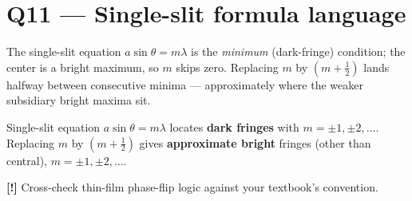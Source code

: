 \documentclass[11pt]{article}
\newcommand{\warn}{\textbf{[!]}}
\begin{document}
\section*{Q11 --- Single-slit formula language}
The single-slit equation $a\sin\theta = m\lambda$ is the \emph{minimum} (dark-fringe) condition; the center is a bright maximum, so $m$ skips zero. Replacing $m$ by $(m+\tfrac12)$ lands halfway between consecutive minima --- approximately where the weaker subsidiary bright maxima sit.

Single-slit equation $a\sin\theta = m\lambda$ locates \textbf{dark fringes} with $m=\pm1,\pm2,\dots$. Replacing $m$ by $(m+\tfrac12)$ gives \textbf{approximate bright} fringes (other than central), $m=\pm1,\pm2,\dots$.

\bigskip\warn{} Cross-check thin-film phase-flip logic against your textbook's convention.
\end{document}
